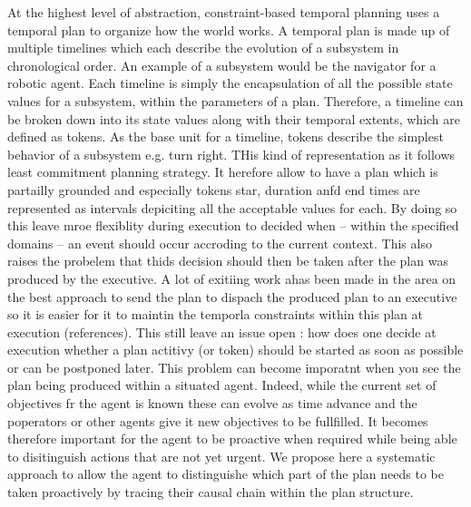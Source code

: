 At the highest level of abstraction, constraint-based temporal
planning uses a temporal plan to organize how the world works. A
temporal plan is made up of multiple timelines which each describe the
evolution of a subsystem in chronological order. An example of a
subsystem would be the navigator for a robotic agent. Each timeline is
simply the encapsulation of all the possible state values for a
subsystem, within the parameters of a plan.  Therefore, a timeline can
be broken down into its state values along with their temporal
extents, which are defined as tokens. As the base unit for a timeline,
tokens describe the simplest behavior of a subsystem e.g. turn
right. THis kind of representation as it follows least commitment
planning strategy. It herefore allow to have a plan which is partailly
grounded and especially tokens star, duration anfd end times are
represented as intervals depiciting all the acceptable values for
each. By doing so this leave  mroe flexiblity during execution to
decided when -- within the specified domains -- an event should
occur accroding to the current context. This also raises the probelem
that thids decision should then be taken after the plan was produced
by the executive. A lot of exitiing work ahas been made in the area on
the best approach to send the plan to dispach the produced plan to an
executive so it is easier for it to maintin the temporla constraints
within this plan at execution (references). This still leave an issue
open : how does one decide at execution whether a plan actitivy (or
token) should be started as soon as possible or can be postponed
later. This problem can become imporatnt when you see the plan being
produced within a situated agent. Indeed, while the current set of
objectives fr the agent is known these can evolve as time advance and
the poperators or other agents give it new objectives to be
fullfilled. It becomes therefore important for the agent to be
proactive when required while being able to disitinguish actions that
are not yet urgent. We propose here a systematic  approach to allow
the agent to distinguishe which part of the plan needs to be taken
proactively by tracing their causal chain within the plan structure.


